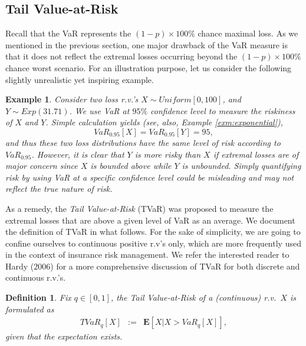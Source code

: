 \documentclass[12pt]{article}
\newtheorem{definition}{\bf Definition}
\newtheorem{example}{\bf Example}
\begin{document}
\subsection{Tail Value-at-Risk}

Recall that the VaR represents the $(1-p)\times100\%$ chance maximal loss.  As we mentioned in the previous section, one major drawback of the VaR measure is that it does not reflect the extremal losses occurring beyond the $(1-p)\times100\%$ chance worst scenario.  For an illustration purpose, let us consider the following slightly unrealistic yet inspiring example.
\begin{example}
 Consider two loss r.v.'s $X\sim Uniform [0,100]$, and $Y\sim Exp(31.71)$.  We use VaR at $95\%$ confidence level to measure the riskiness of $X$ and $Y$.  Simple calculation yields (see, also, Example \ref{exm:exponential}),
\[
VaR_{0.95}[X]=VaR_{0.95}[Y]=95,
\]
and thus these two loss distributions have the same level of risk according to $VaR_{0.95}$.  However, it is clear that $Y$ is more risky than $X$ if extremal losses are of major concern since $X$ is bounded above while $Y$ is unbounded. Simply quantifying risk by using VaR at a specific confidence level could be misleading and may not reflect the true nature of risk.
\end{example}

As a remedy, the \textit{Tail Value-at-Risk} (TVaR) was proposed to measure the extremal losses that are above a given level of VaR as an average.  We document the definition of TVaR in what follows.  For the sake of simplicity, we are going to confine ourselves to continuous positive r.v's only, which are more frequently used in the context of insurance risk management.  We refer the interested reader to Hardy (2006) for a more comprehensive discussion of TVaR for both discrete and continuous r.v.'s.

\begin{definition}
\label{def:TVaR}
Fix $q\in [0,1]$, the Tail Value-at-Risk of a (continuous) r.v.\ $X$ is formulated as
\begin{eqnarray*}
  TVaR_q[X] &:=& \mathbf{E}[X|X>VaR_q[X]],
\end{eqnarray*}
given that the expectation exists.
\end{definition}
\end{document}
